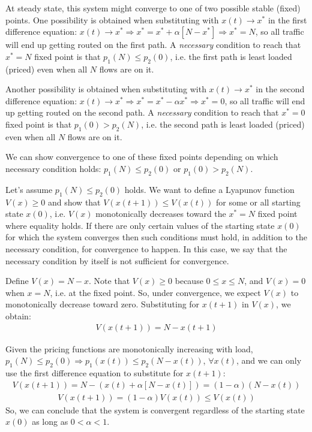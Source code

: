 \documentclass{article}
\begin{document}
At steady state, this system might converge to one of two possible stable (fixed) points.
One possibility is obtained when substituting with $x(t) \rightarrow x^*$ in the first difference equation: 
$x(t) \rightarrow x^* \Rightarrow x^* = x^* + \alpha [N - x^*] \Rightarrow x^* = N$, 
so all traffic will end up getting routed on the first path. 
A {\em necessary} condition to reach that $x^* = N$ fixed point is that $p_1(N) \leq p_2(0)$, i.e. 
the first path is least loaded (priced) even when all $N$ flows are on it.

Another possibility is obtained when substituting with $x(t) \rightarrow x^*$ in the second difference equation:
$x(t) \rightarrow x^* \Rightarrow x^* = x^* - \alpha x^* \Rightarrow x^* = 0$, 
so all traffic will end up getting routed on the second path. 
A {\em necessary} condition to reach that $x^* = 0$ fixed point is that $p_1(0) > p_2(N)$, i.e. 
the second path is least loaded (priced) even when all $N$ flows are on it.

We can show convergence to one of these fixed points depending on which necessary condition holds: 
$p_1(N) \leq p_2(0)$ or $p_1(0) > p_2(N)$.

Let's assume $p_1(N) \leq p_2(0)$ holds. We want to define a Lyapunov function $V(x) \geq 0$ and show that
$V(x(t+1)) \leq V(x(t))$ for some or all starting state $x(0)$, 
i.e. $V(x)$ monotonically decreases toward the $x^* = N$ fixed point
where equality holds.
If there are only certain values of the starting state $x(0)$ for which the system converges then
such conditions must hold, in addition to the necessary condition,
for convergence to happen. 
In this case, we say that the necessary condition by itself is not sufficient for convergence.

Define $V(x) = N - x$. Note that $V(x) \geq 0$ because $0 \leq x \leq N$, and $V(x) = 0$ when $x = N$, i.e. at the fixed point. 
So, under convergence, we expect $V(x)$ to monotonically decrease toward zero. 
Substituting for $x(t+1)$ in $V(x)$, we obtain:
\begin{eqnarray*}
V(x(t+1)) = N - x(t+1) 
\end{eqnarray*}

Given the pricing functions are monotonically increasing with load,
$p_1(N) \leq p_2(0) \Rightarrow p_1(x(t)) \leq p_2(N -  x(t))$, $\forall x(t)$, 
and we can only use the first difference equation to substitute for $x(t+1)$:
\begin{eqnarray*}
V(x(t+1)) = N - (x(t) + \alpha [N - x(t)]) = (1 - \alpha)(N - x(t)) 
\end{eqnarray*}
\begin{eqnarray*}
V(x(t+1)) =   (1 - \alpha) V(x(t)) \leq V(x(t))
\end{eqnarray*}
So, we can conclude that the system is convergent regardless of the starting state $x(0)$ as long as $0 < \alpha < 1$.
\end{document}
